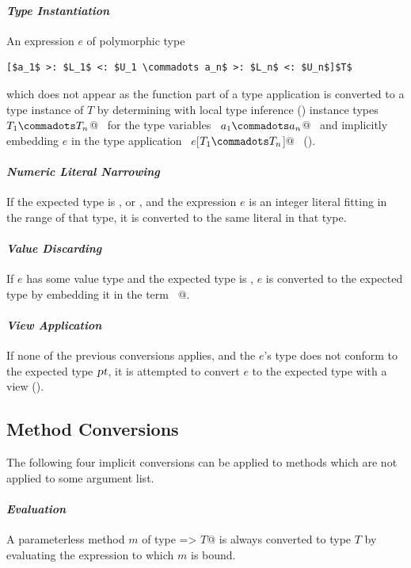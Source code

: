 \paragraph{\em Type Instantiation}  
An expression $e$ of polymorphic type
\begin{lstlisting}
[$a_1$ >: $L_1$ <: $U_1 \commadots a_n$ >: $L_n$ <: $U_n$]$T$
\end{lstlisting}
which does not appear as the function part of
a type application is converted to a type instance of $T$
by determining with local type inference
() instance types ~\lstinline@$T_1 \commadots T_n$@~ 
for the type variables ~\lstinline@$a_1 \commadots a_n$@~ and
implicitly embedding $e$ in the type application
~\lstinline@$e$[$T_1 \commadots T_n$]@~ ().

\paragraph{\em Numeric Literal Narrowing}
If the expected type is ,  or , and
the expression $e$ is an integer literal fitting in the range of that
type, it is converted to the same literal in that type.

\paragraph{\em Value Discarding}
If $e$ has some value type and the expected type is ,
$e$ is converted to the expected type by embedding it in the 
term ~@.

\paragraph{\em View Application}
If none of the previous conversions applies, and the $e$'s type
does not conform to the expected type $\mbox{\sl pt}$, it is attempted to convert
$e$ to the expected type with a view ().\bigskip

\subsection{Method Conversions}

The following four implicit conversions can be applied to methods
which are not applied to some argument list.

\paragraph{\em Evaluation}
A parameterless method $m$ of type \lstinline@=> $T$@ is always converted to
type $T$ by evaluating the expression to which $m$ is bound.

